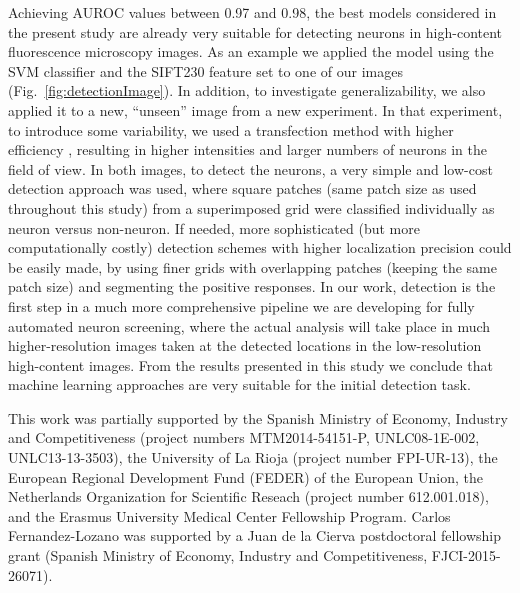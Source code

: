 Achieving AUROC values between {\color{red}0.97 and 0.98, the best models considered in the present study are already very suitable for detecting neurons in high-content fluorescence microscopy images. As an example we applied the model using the SVM classifier and the SIFT230 feature set to one of our images (Fig.~\ref{fig:detectionImage}). In addition, to investigate generalizability, we also applied it to a new, ``unseen'' image from a new experiment. In that experiment, to introduce some variability, we used a transfection method with higher efficiency \citep{Bredenbeek1993}, resulting in higher intensities and larger numbers of neurons in the field of view. In both images, to detect the neurons,} a very simple and low-cost detection approach was used, where square patches (same patch size as used throughout this study) from a superimposed grid were classified individually as neuron versus non-neuron. If needed, more sophisticated (but more computationally costly) detection schemes with higher localization precision could be easily made, by using finer grids with overlapping patches (keeping the same patch size) and segmenting the positive responses. In our work, detection is the first step in a much more comprehensive pipeline we are developing for fully automated neuron screening, where the actual analysis will take place in much higher-resolution images taken at the detected locations in the low-resolution high-content images. From the results presented in this study we conclude that machine learning approaches are very suitable for the initial detection task.

\begin{acknowledgments}
This work was partially supported by the Spanish Ministry of Economy, Industry and Competitiveness (project numbers MTM2014-54151-P, UNLC08-1E-002, UNLC13-13-3503), the University of La Rioja (project number FPI-UR-13), the European Regional Development Fund (FEDER) of the European Union, the Netherlands Organization for Scientific Reseach (project number 612.001.018), and the Erasmus University Medical Center Fellowship Program. Carlos Fernandez-Lozano was supported by a Juan de la Cierva postdoctoral fellowship grant (Spanish Ministry of Economy, Industry and Competitiveness, FJCI-2015-26071).
\end{acknowledgments}

%

